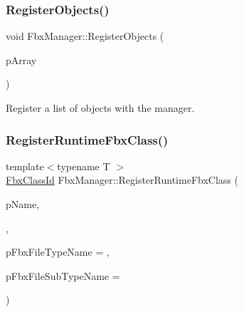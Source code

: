 \subsubsection{\texorpdfstring{Register\+Objects()}{RegisterObjects()}}
{\footnotesize\ttfamily void Fbx\+Manager\+::\+Register\+Objects (\begin{DoxyParamCaption}\item[{const \hyperlink{class_fbx_array}{Fbx\+Array}$<$ \hyperlink{class_fbx_object}{Fbx\+Object} $\ast$$>$ \&}]{p\+Array }\end{DoxyParamCaption})}

Register a list of objects with the manager. \mbox{\label{class_fbx_manager_ae7669c6398bfbe4bbf3fcb3206df17b0}} 
\subsubsection{\texorpdfstring{Register\+Runtime\+Fbx\+Class()}{RegisterRuntimeFbxClass()}}
{\footnotesize\ttfamily template$<$typename T $>$ \\
\hyperlink{class_fbx_class_id}{Fbx\+Class\+Id} Fbx\+Manager\+::\+Register\+Runtime\+Fbx\+Class (\begin{DoxyParamCaption}\item[{const char $\ast$}]{p\+Name,  }\item[{const T $\ast$}]{,  }\item[{const char $\ast$}]{p\+Fbx\+File\+Type\+Name = {},  }\item[{const char $\ast$}]{p\+Fbx\+File\+Sub\+Type\+Name = {} }\end{DoxyParamCaption})}


